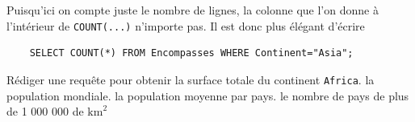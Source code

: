 Puisqu'ici on compte juste le nombre de lignes, la colonne que l'on donne à l'intérieur de \texttt{COUNT(...)} n'importe pas. Il est donc plus élégant d'écrire

\begin{verbatim}
    SELECT COUNT(*) FROM Encompasses WHERE Continent="Asia";
\end{verbatim}

\ques Rédiger une requête pour obtenir
\ssques la surface totale du continent \texttt{Africa}.
\ssques la population mondiale.
\ssques la population moyenne par pays.
\ssques le nombre de pays de plus de 1 000 000 de $ \textrm{km}^2 $

%
%
%
%
%


